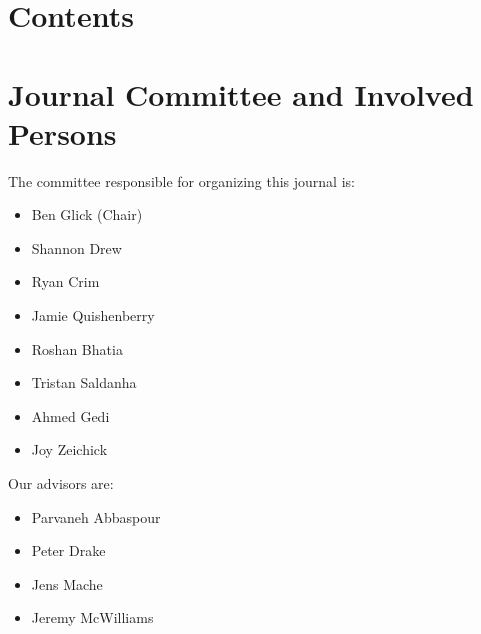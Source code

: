 \documentclass[12pt, letterpaper]{article}
\begin{document}
\begin{titlepage}
	
	
    
    
    
    
	
\end{titlepage}

\section{Contents}
\newcommand{\addsection}[3]{\addtocontents{toc}{\protect\contentsline{section}{\protect\numberline{#1}#2}{#3}}}
\newcommand{\addsubsection}[3]{\addtocontents{toc}{\protect\contentsline{subsection}{\protect\numberline{#1}#2}{#3}}}



\tableofcontents




\section{Journal Committee and Involved Persons}
The committee responsible for organizing this journal is:
\begin{itemize}
  \item Ben Glick (Chair)
  \item Shannon Drew
  \item Ryan Crim
  \item Jamie Quishenberry
  \item Roshan Bhatia
  \item Tristan Saldanha
  \item Ahmed Gedi
  \item Joy Zeichick
\end{itemize}
Our advisors are:
\begin{itemize}
  \item Parvaneh Abbaspour
  \item Peter Drake
  \item Jens Mache
  \item Jeremy McWilliams
\end{itemize}
\end{document}
